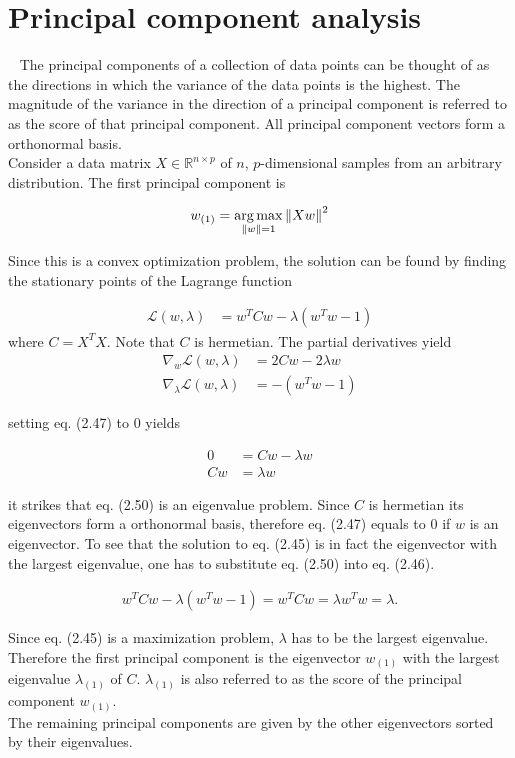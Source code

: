 \section{Principal component analysis}~\label{sec:pca}
The principal components of a collection of data points can be thought of as the directions in which the variance of the data points is the highest. The magnitude of the variance in the direction of a principal component is referred to as the score of that principal component. All principal component vectors form a orthonormal basis.\\
Consider a data matrix $X \in \mathbb{R}^{n\times p}$ of $n$, $p$-dimensional samples from an arbitrary distribution. The first principal component is

\begin{align}
	w_{(1)} = \operatorname*{arg\,max}_{\left\lVert w\right\rVert = 1} \left\lVert Xw\right\rVert^2
\end{align}

Since this is a convex optimization problem, the solution can be found by finding the stationary points of the Lagrange function

\begin{align}
	\mathcal{L}(w, \lambda) &= w^TCw - \lambda(w^Tw -1)
\end{align}
where $C = X^TX$. Note that $C$ is hermetian.
The partial derivatives yield	
\begin{align}
	\nabla_w \mathcal{L}(w, \lambda) &= 2Cw-2\lambda w \\
	\nabla_\lambda \mathcal{L}(w, \lambda) &= - (w^Tw -1)
\end{align}

setting eq. (2.47) to $0$ yields

\begin{align}
	0 &= Cw-\lambda w \\
	Cw &= \lambda w
\end{align}

it strikes that eq. (2.50) is an eigenvalue problem. Since $C$ is hermetian its eigenvectors form a orthonormal basis, therefore eq. (2.47) equals to $0$ if $w$ is an eigenvector. To see that the solution to eq. (2.45) is in fact the eigenvector with the largest eigenvalue, one has to substitute eq. (2.50) into eq. (2.46).

\begin{align}
	w^TCw - \lambda(w^Tw -1) = w^TCw = \lambda w^Tw = \lambda.
\end{align}

Since eq. (2.45) is a maximization problem, $\lambda$ has to be the largest eigenvalue.
Therefore the first principal component is the eigenvector $w_{(1)}$ with the largest eigenvalue $\lambda_{(1)}$ of $C$. $\lambda_{(1)}$ is also referred to as the score of the principal component $w_{(1)}$. \\

The remaining principal components are given by the other eigenvectors sorted by their eigenvalues.
